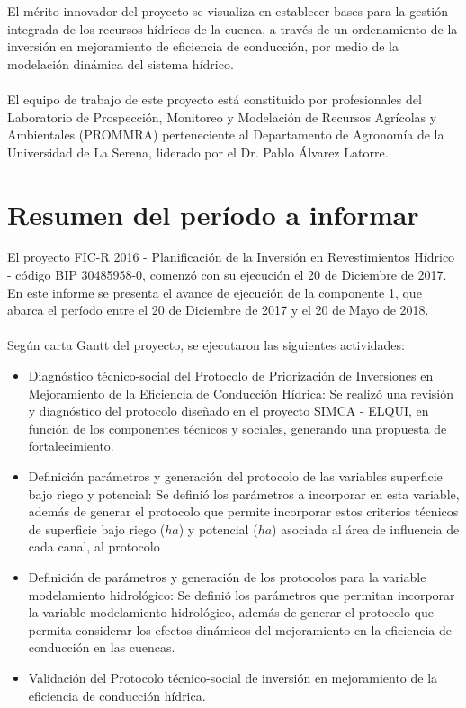 \documentclass[]{article}
\begin{document}
El mérito innovador del proyecto se visualiza en establecer bases para la gestión integrada de los recursos hídricos de la cuenca, a través de un ordenamiento de la inversión en mejoramiento de eficiencia de conducción, por medio de la modelación dinámica del sistema hídrico.\\
\\
El equipo de trabajo de este proyecto está constituido por profesionales del Laboratorio de Prospección, Monitoreo y Modelación de Recursos Agrícolas y Ambientales (PROMMRA) perteneciente al Departamento de Agronomía de la Universidad de La Serena, liderado por el Dr. Pablo Álvarez Latorre.\\
\clearpage

\section{Resumen del período a informar}

El proyecto FIC-R 2016 - Planificación de la Inversión en Revestimientos Hídrico - código BIP 30485958-0, comenzó con su ejecución el 20 de Diciembre de 2017. En este informe se presenta el avance de ejecución de la componente 1, que abarca el período entre el 20 de Diciembre de 2017 y el 20 de Mayo de 2018.\\
\\
Según carta Gantt del proyecto, se ejecutaron las siguientes actividades:
\begin{itemize}
\item Diagnóstico técnico-social del Protocolo de Priorización de Inversiones en Mejoramiento de la Eficiencia de Conducción Hídrica: Se realizó una revisión y diagnóstico del protocolo diseñado en el proyecto SIMCA - ELQUI, en función de los componentes técnicos y sociales, generando una propuesta de fortalecimiento.
\item Definición parámetros y generación del protocolo de las variables superficie bajo riego y potencial: Se definió los parámetros a incorporar en esta variable, además de generar el protocolo que permite incorporar estos criterios técnicos de superficie bajo riego ($ha$) y potencial ($ha$) asociada al área de influencia de cada canal, al protocolo 
\item Definición de parámetros y generación de los protocolos para la variable modelamiento hidrológico: Se definió los parámetros que permitan incorporar la variable modelamiento hidrológico, además de generar el protocolo que permita considerar los efectos dinámicos del mejoramiento en la eficiencia de conducción en las cuencas.
\item Validación del Protocolo técnico-social de inversión en mejoramiento de la eficiencia de conducción hídrica.
\end{itemize}
\end{document}
